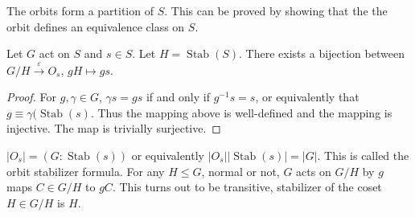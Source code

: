 \documentclass{article}
\newcommand{\eps}{\varepsilon}
\newcommand{\ra}[1][]{\xrightarrow{#1}}
\DeclareMathOperator{\Stab}{Stab}
\begin{document}
\begin{proposition}
The orbits form a partition of $S$. This can be proved by showing that the the orbit defines an equivalence class on $S$.
\end{proposition}
\begin{proposition}
Let $G$ act on $S$ and $s\in S$. Let $H=\Stab(S)$. There exists a bijection between $G/H\ra[\eps]O_s$, $gH\mapsto gs$.
\end{proposition}
\begin{proof}
For $g,\gamma\in G$, $\gamma s=gs$ if and only if $g^{-1}s=s$, or equivalently that $g\equiv \gamma (\Stab(s)$. Thus the mapping above is well-defined and the mapping is injective. The map is trivially surjective.
\end{proof}
\begin{corollary}
$|O_s|=(G:\Stab(s))$ or equivalently $|O_s||\Stab(s)|=|G|$. This is called the orbit stabilizer formula. For any $H\leq G$, normal or not, $G$ acts on $G/H$ by $g$ maps $C\in G/H$ to $gC$. This turns out to be transitive, stabilizer of the coset $H\in G/H$ is $H$.
\end{corollary}
\end{document}
